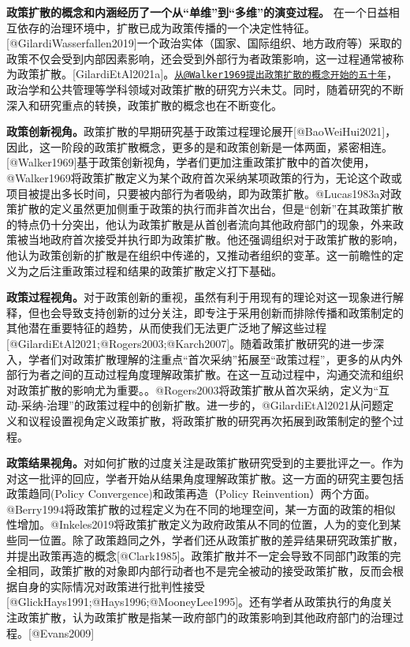 \documentclass[
  12pt,
]{ctexart}
\begin{document}
\textbf{政策扩散的概念和内涵经历了一个从``单维''到``多维''的演变过程。}
在一个日益相互依存的治理环境中，扩散已成为政策传播的一个决定性特征。{[}@GilardiWasserfallen2019{]}一个政治实体（国家、国际组织、地方政府等）采取的政策不仅会受到内部因素影响，还会受到外部行为者政策影响，这一过程通常被称为政策扩散。{[}GilardiEtAl2021a{]}。\href{mailto:从@Walker1969提出政策扩散的概念开始的五十年}{\nolinkurl{从@Walker1969提出政策扩散的概念开始的五十年}}，政治学和公共管理等学科领域对政策扩散的研究方兴未艾。同时，随着研究的不断深入和研究重点的转换，政策扩散的概念也在不断变化。

\textbf{政策创新视角。}政策扩散的早期研究基于政策过程理论展开{[}@BaoWeiHui2021{]}，因此，这一阶段的政策扩散概念，更多的是和政策创新是一体两面，紧密相连。{[}@Walker1969{]}基于政策创新视角，学者们更加注重政策扩散中的首次使用，@Walker1969将政策扩散定义为某个政府首次采纳某项政策的行为，无论这个政或项目被提出多长时间，只要被内部行为者吸纳，即为政策扩散。@Lucas1983a对政策扩散的定义虽然更加侧重于政策的执行而非首次出台，但是``创新''在其政策扩散的特点仍十分突出，他认为政策扩散是从首创者流向其他政府部门的现象，外来政策被当地政府首次接受并执行即为政策扩散。他还强调组织对于政策扩散的影响，他认为政策创新的扩散是在组织中传递的，又推动者组织的变革。这一前瞻性的定义为之后注重政策过程和结果的政策扩散定义打下基础。

\textbf{政策过程视角。}对于政策创新的重视，虽然有利于用现有的理论对这一现象进行解释，但也会导致支持创新的过分关注，即专注于采用创新而排除传播和政策制定的其他潜在重要特征的趋势，从而使我们无法更广泛地了解这些过程{[}@GilardiEtAl2021;@Rogers2003;@Karch2007{]}。随着政策扩散研究的进一步深入，学者们对政策扩散理解的注重点``首次采纳''拓展至``政策过程''，更多的从内外部行为者之间的互动过程角度理解政策扩散。在这一互动过程中，沟通交流和组织对政策扩散的影响尤为重要。。@Rogers2003将政策扩散从首次采纳，定义为``互动-采纳-治理''的政策过程中的创新扩散。进一步的，@GilardiEtAl2021从问题定义和议程设置视角定义政策扩散，将政策扩散的研究再次拓展到政策制定的整个过程。

\textbf{政策结果视角。}对如何扩散的过度关注是政策扩散研究受到的主要批评之一。作为对这一批评的回应，学者开始从结果角度理解政策扩散。这一方面的研究主要包括政策趋同(Policy Convergence)和政策再造（Policy Reinvention）两个方面。@Berry1994将政策扩散的过程定义为在不同的地理空间，某一方面的政策的相似性增加。@Inkeles2019将政策扩散定义为政府政策从不同的位置，人为的变化到某些同一位置。除了政策趋同之外，学者们还从政策扩散的差异结果研究政策扩散，并提出政策再造的概念{[}@Clark1985{]}。政策扩散并不一定会导致不同部门政策的完全相同，政策扩散的对象即内部行动者也不是完全被动的接受政策扩散，反而会根据自身的实际情况对政策进行批判性接受{[}@GlickHays1991;@Hays1996;@MooneyLee1995{]}。还有学者从政策执行的角度关注政策扩散，认为政策扩散是指某一政府部门的政策影响到其他政府部门的治理过程。{[}@Evans2009{]}
\end{document}
